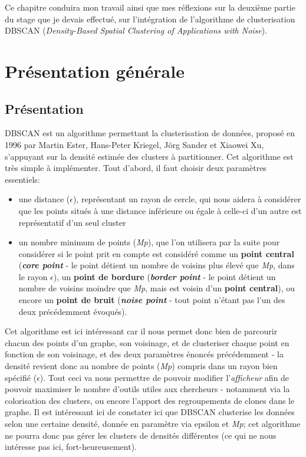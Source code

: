 \documentclass[12pt]{report}
\begin{document}
\begin{spacing}{1.2}
Ce chapitre conduira mon travail ainsi que mes réflexions sur la deuxième partie du stage que je devais effectué, sur l'intégration de l'algorithme de clusterisation DBSCAN (\textit{Density-Based Spatial Clustering of Applications with Noise}).

\section{Présentation générale}

\subsection{Présentation}
DBSCAN est un algorithme permettant la clusterisation de données, proposé en 1996 par Martin Ester, Hans-Peter Kriegel, Jörg Sander et Xiaowei Xu, s'appuyant sur la densité estimée des clusters à partitionner.
\newline
Cet algorithme est très simple à implémenter.
\newline
Tout d'abord, il faut choisir deux paramètres essentiels:
\begin{itemize}
\item une distance ($\epsilon$), représentant un rayon de cercle, qui nous aidera à considérer que les points situés à une distance inférieure ou égale à celle-ci d'un autre est représentatif d'un seul cluster
\item un nombre minimum de points (\textit{Mp}), que l'on utilisera par la suite pour considérer si le point prit en compte est considéré comme un \textbf{point central} (\textit{\textbf{core point}} - le point détient un nombre de voisins plus élevé que \textit{Mp}, dans le rayon $\epsilon$), un \textbf{point de bordure} (\textit{\textbf{border point}} - le point détient un nombre de voisins moindre que \textit{Mp}, mais est voisin d'un \textbf{point central}), ou encore un \textbf{point de bruit} (\textit{\textbf{noise point}} - tout point n'étant pas l'un des deux précédemment évoqués).
\end{itemize}
Cet algorithme est ici intéressant car il nous permet donc bien de parcourir chacun des points d'un graphe, son voisinage, et de clusteriser chaque point en fonction de son voisinage, et des deux paramètres énoncés précédemment - la densité revient donc au nombre de points (\textit{Mp}) compris dans un rayon bien spécifié ($\epsilon$). Tout ceci va nous permettre de pouvoir modifier l'\textit{afficheur} afin de pouvoir maximiser le nombre d'outils utiles aux chercheurs - notamment via la colorisation des clusters, ou encore l'apport des regroupements de clones dans le graphe.
\newline
Il est intéressant ici de constater ici que DBSCAN clusterise les données selon une certaine densité, donnée en paramètre via epsilon et \textit{Mp}; cet algorithme ne pourra donc pas gérer les clusters de densités différentes (ce qui ne nous intéresse pas ici, fort-heureusement).


\end{spacing}
\end{document}
